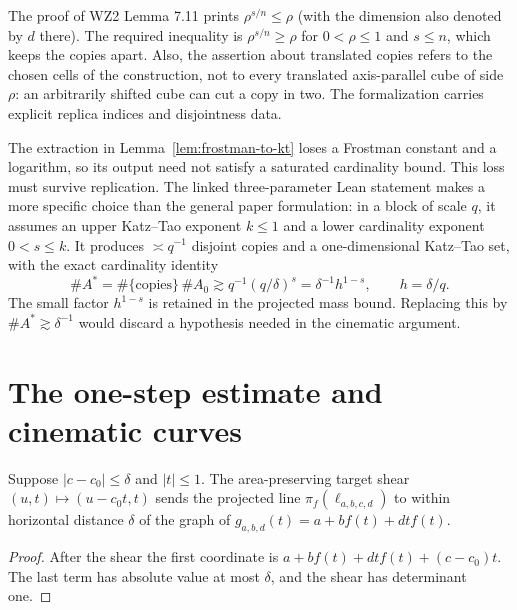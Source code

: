 \begin{remark}
\label{rem:replication}
The proof of WZ2 Lemma 7.11 prints $\rho^{s/n}\leq\rho$ (with the
dimension also denoted by $d$ there). The required inequality is
$\rho^{s/n}\geq\rho$ for $0<\rho\leq1$ and $s\leq n$, which
keeps the copies apart. Also, the assertion about translated copies
refers to the chosen cells of the construction, not to every translated
axis-parallel cube of side $\rho$: an arbitrarily shifted cube can
cut a copy in two. The formalization carries explicit replica
indices and disjointness data.
\end{remark}

\begin{remark}
\label{rem:replication-deficit}
The extraction in Lemma~\ref{lem:frostman-to-kt} loses a Frostman
constant and a logarithm, so its output need not satisfy a saturated
cardinality bound. This loss must survive replication.
The linked three-parameter Lean statement makes a more specific
choice than the general paper formulation: in a block of scale $q$,
it assumes an upper Katz--Tao exponent $k\leq1$ and a lower
cardinality exponent $0<s\leq k$. It produces $\asymp q^{-1}$
disjoint copies and a one-dimensional Katz--Tao set, with the exact
cardinality identity
\[
 \#A^*=\#\{\text{copies}\}\,\#A_0
       \gtrsim q^{-1}(q/\delta)^s
       =\delta^{-1}h^{1-s},\qquad h=\delta/q.
\]
The small factor $h^{1-s}$ is retained in the projected mass bound.
Replacing this by $\#A^*\gtrsim\delta^{-1}$ would discard a
hypothesis needed in the cinematic argument.
\end{remark}

\section{The one-step estimate and cinematic curves}

\begin{lemma}
\label{lem:freeze-line-parameter}
Suppose $|c-c_0|\leq\delta$ and $|t|\leq1$. The area-preserving
target shear $(u,t)\mapsto(u-c_0t,t)$ sends the projected line
$\pi_f(\ell_{a,b,c,d})$ to within horizontal distance $\delta$ of
the graph of $g_{a,b,d}(t)=a+bf(t)+dtf(t)$.
\end{lemma}
\begin{proof}
After the shear the first coordinate is
$a+bf(t)+dtf(t)+(c-c_0)t$. The last term has absolute value at
most $\delta$, and the shear has determinant one.
\end{proof}

